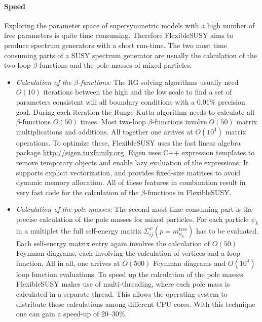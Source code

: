 \documentclass[final,3p,11pt,pdflatex]{elsarticle}
\makeatletter
\newcommand{\fs}{FlexibleSUSY\@\xspace}
\makeatother
\begin{document}
\paragraph{Speed}

Exploring the parameter space of supersymmetric models with a high
number of free parameters is quite time consuming.  Therefore \fs aims
to produce spectrum generators with a short run-time.  The two most
time consuming parts of a SUSY spectrum generator are usually the
calculation of the two-loop $\beta$-functions and the pole masses of
mixed particles:
%
\begin{itemize}
\item \emph{Calculation of the $\beta$-functions:} The RG solving
  algorithms usually need $O(10)$ iterations between the high and the
  low scale to find a set of parameters consistent will all boundary
  conditions with a $0.01\%$ precision goal.  During each iteration
  the Runge-Kutta algorithm needs to calculate all $\beta$-functions
  $O(50)$ times.  Most two-loop $\beta$-functions involve $O(50)$
  matrix multiplications and additions.  All together one arrives at
  $O(10^4)$ matrix operations.  To optimize these, \fs uses the fast
  linear algebra package \href{Eigen}{http://eigen.tuxfamily.org}.
  Eigen uses C++ expression templates to remove temporary objects and
  enable lazy evaluation of the expressions.  It supports explicit
  vectorization, and provides fixed-size matrices to avoid dynamic
  memory allocation.  All of these features in combination result in
  very fast code for the calculation of the $\beta$-functions in \fs.
%
\item \emph{Calculation of the pole masses:} The second most time
  consuming part is the precise calculation of the pole masses for
  mixed particles.  For each particle $\psi_k$ in a multiplet the full
  self-energy matrix $\Sigma^\psi_{ij}(p=m^\text{tree}_{\psi_k})$ has
  to be evaluated.  Each self-energy matrix entry again involves the
  calculation of $O(50)$ Feynman diagrams, each involving the
  calculation of vertices and a loop-function.  All in all, one
  arrives at $O(500)$ Feynman diagrams and $O(10^4)$ loop function
  evaluations.  To speed up the calculation of the pole masses \fs
  makes use of multi-threading, where each pole mass is calculated in
  a separate thread.  This allows the operating system to distribute
  these calculations among different CPU cores.  With this technique
  one can gain a speed-up of $20$--$30\%$.
\end{itemize}
\end{document}
